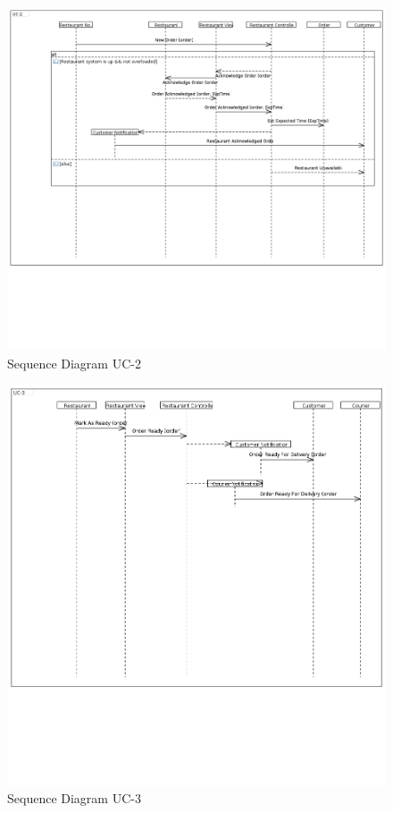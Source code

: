 \begin{figure}[h!]
\begin{center}
\includegraphics[scale=0.35]{FIGS/UC-21.PNG}
    \caption{Sequence Diagram UC-2}
    \label{fig:seq_diag3}
\end{center}
\end{figure}

\begin{figure}[h!]
\begin{center}
\includegraphics[scale=0.35]{FIGS/UC-31.PNG}
    \caption{Sequence Diagram UC-3}
    \label{fig:seq_diag3}
\end{center}
\end{figure}

